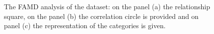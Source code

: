 \documentclass[
12pt, %
a4paper, %
oneside, %
headinclude,footinclude, %
BCOR5mm, %
]{scrartcl}
\begin{document}
\begin{figure}[h]
\begin{center}
\\
\\
\caption{The FAMD analysis of the dataset: on the panel (a)  the relationship square, on  the panel (b) the correlation circle is provided and on panel (c) the representation of the categories is given.}
\label{PCA+SVM_PLOT}
\end{center}
\end{figure}
\end{document}
